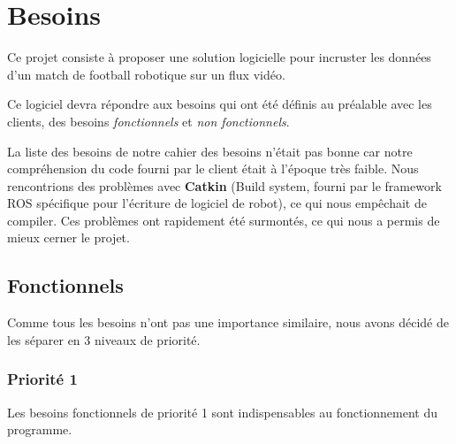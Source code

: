 \chapter{Besoins}

Ce projet consiste à proposer une solution logicielle pour 
incruster les données d'un match de football robotique sur un 
flux vidéo.

Ce logiciel devra répondre aux besoins qui ont été définis au 
préalable avec les clients, des besoins \textit{fonctionnels} et 
\textit{non fonctionnels}.
\bigskip

La liste des besoins de notre cahier des besoins n'était pas 
bonne car notre compréhension du code fourni par le client était 
à l'époque très faible. Nous rencontrions des problèmes avec 
\textbf{Catkin} (Build system, fourni par le framework ROS 
spécifique pour l'écriture de logiciel de robot), ce qui nous 
empêchait de compiler. Ces problèmes ont rapidement été 
surmontés, ce qui nous a permis de mieux cerner le projet. 
 
\section{Fonctionnels}

Comme tous les besoins n'ont pas une importance similaire, nous 
avons décidé de les séparer en 3 niveaux de priorité.

\subsection{Priorité 1}

Les besoins fonctionnels de priorité 1 sont indispensables au 
fonctionnement du programme. 
\bigskip

